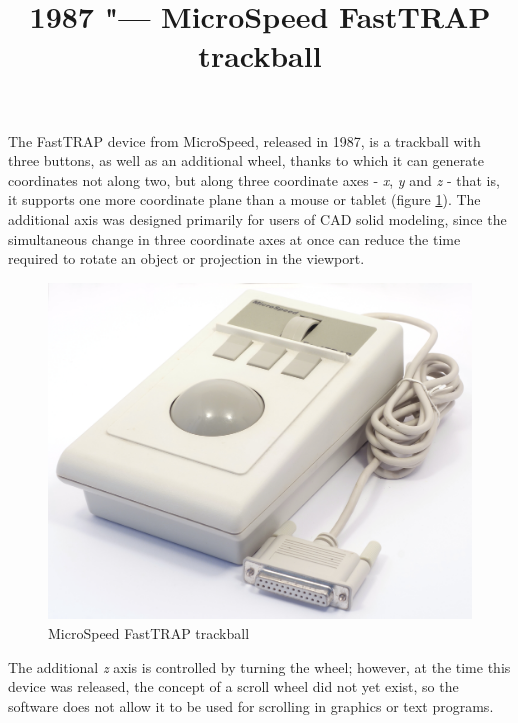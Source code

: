 \documentclass[11pt, a4paper]{article}
\begin{document}
\title{1987 "--- MicroSpeed FastTRAP trackball}
\date{}
\maketitle
{}
The FastTRAP device from MicroSpeed, released in 1987, is a trackball with three buttons, as well as an additional wheel, thanks to which it can generate coordinates not along two, but along three coordinate axes - \textit{x}, \textit{y} and \textit{z} - that is, it supports one more coordinate plane than a mouse or tablet (figure \ref{fig:FastTRAPPic}). The additional axis was designed primarily for users of CAD solid modeling, since the simultaneous change in three coordinate axes at once can reduce the time required to rotate an object or projection in the viewport.

\begin{figure}[h]
   \centering
    \includegraphics[scale=0.3]{1987_microspeed_fasttrap/pic_15.jpg}
    \caption{MicroSpeed FastTRAP trackball}
    \label{fig:FastTRAPPic}
\end{figure}

The additional \textit{z} axis is controlled by turning the wheel; however, at the time this device was released, the concept of a scroll wheel did not yet exist, so the software does not allow it to be used for scrolling in graphics or text programs.
\end{document}
